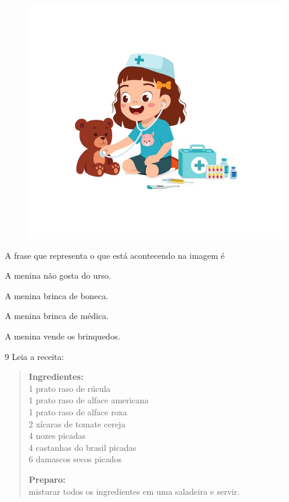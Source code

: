 \begin{figure}[htpb!]
\centering
\includegraphics[width=.5\textwidth]{media/image169.jpeg}
\end{figure}


A frase que representa o que está acontecendo na imagem é

\begin{escolha}
\item A menina não gosta do urso.

\item A menina brinca de boneca.

\item A menina brinca de médica.

\item A menina vende os brinquedos.
\end{escolha}

\pagebreak
\num{9} Leia a receita:

\begin{quote}
\textbf{Ingredientes:}\\
1 prato raso de rúcula\\
1 prato raso de alface americana\\
1 prato raso de alface roxa\\
2 xícaras de tomate cereja\\
4 nozes picadas\\
4 castanhas do brasil picadas\\
6 damascos secos picados

\textbf{Preparo:}\\
misturar todos os ingredientes em uma saladeira e servir.

\end{quote}


